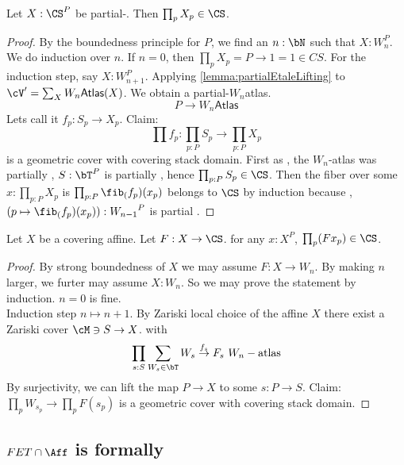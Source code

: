 \begin{lemma}
	Let $X : \CS^P$ be partial-\etale. Then $\prod_p X_p \in \CS$.
\end{lemma}
\begin{proof}
	By the boundedness principle for $P$, we find an $n : \bN$ such that $X : W_{n}^P$.
	We do induction over $n$. If $n = 0$, then $\prod_p X_p = P \to 1 = 1 \in CS$.
	For the induction step, say $X : W_{n+1}^P$.
	Applying \ref{lemma:partialEtaleLifting} to $\cV' = \sum_{X} W_n\mathsf{Atlas}(X)$. We obtain a partial-\etale $W_n$atlas.
	\[
	P \to W_n\mathsf{Atlas}
	\]
	Lets call it $f_p : S_p \to X_p$. Claim:
	\[
	\prod f_p : \prod_{p :P } S_p  \to \prod_{p: P} X_p
	\]
	is a geometric cover with covering stack domain. First as , the $W_n$-atlas was partially \etale, $S : \bT^P$ is partially \etale, hence $\prod_{p : P} S_p \in \CS$. Then the fiber over some $x : \prod_{p: P} X_p$ is $\prod_{p : P} \fib_(f_p) (x_p)$ belongs to $\CS$ by induction because , $(p \mapsto \fib_(f_p) (x_p)): {W_{n-1}}^P$ is partial \etale.	
\end{proof}

\begin{prop}
	Let $X$ be a covering affine. Let $F : X \to \CS$. for any $x : X^P$, $\prod_p (Fx_p) \in \CS$.
\end{prop}
\begin{proof}
	By strong boundedness of $X$ we may assume $F : X \to W_n$. By making $n$ larger, we furter may assume $X : W_n$. So we may prove the statement by induction. $n=0$ is fine. \\
	Induction step $n \mapsto n+1$. By Zariski local choice of the affine $X$ there exist a Zariski cover $\cM \ni S \to X$. with 
	\[\prod_{s: S} \sum_{W_s \in \bT} W_s \overset{f_s}{\to} F_s \ W_{n}-\text {atlas}\]
	By surjectivity, we can lift the map $P \to X$ to some $s : P \to S$.
	Claim: $\prod_p W_{s_p} \to \prod_{p} F(s_p)$ is a geometric cover with covering stack domain.
	
\end{proof}


\subsection{$FET \cap \Aff$ is formally \etale}

